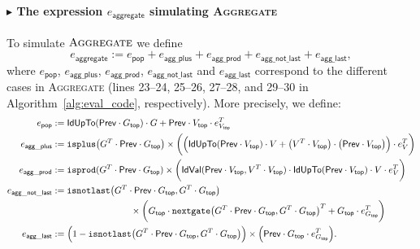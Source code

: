 \paragraph{$\blacktriangleright$ The expression $e_{\mathsf{aggregate}}$ simulating {\normalfont\textsc{Aggregate}}}
To simulate $\textsc{Aggregate}$ we define
$$
	e_{\mathsf{aggregate}}:=e_{\mathsf{pop}}+e_{\mathsf{agg\_plus}}+e_{\mathsf{agg\_prod}}+e_{\mathsf{agg\_not\_last}}+e_{\mathsf{agg\_last}},
	$$
where  $e_{\mathsf{pop}}$, $e_{\mathsf{agg\_plus}}$, $e_{\mathsf{agg\_prod}}$, $e_{\mathsf{agg\_not\_last}}$ and $e_{\mathsf{agg\_last}}$ correspond to the different cases in \textsc{Aggregate} (lines 23--24, 25--26, 27--28, and 29--30 in Algorithm~\ref{alg:eval_code}, respectively). More precisely, we define:
%
    \begin{align*}\allowdisplaybreaks
        e_{\mathsf{pop}} &:= \Iden{\mathsf{Prev}\cdot G_{\mathsf{top}}}\cdot G + \mathsf{Prev}\cdot V_{\mathsf{top}}\cdot e_{V_{\mathsf{top}}}^T  \\
        e_{\mathsf{agg\_plus}}&:= \texttt{isplus}\bigl(G^T \cdot \mathsf{Prev} \cdot G_{\mathsf{top}}\bigr) \times \biggl(\Bigl(\Iden{\mathsf{Prev}\cdot V_{\mathsf{top}}} \cdot V + \bigl( V^T \cdot V_{\mathsf{top}} \bigr)\cdot \bigl(\mathsf{Prev}\cdot V_{\mathsf{top}}\bigr)\Bigr) \cdot e_{V}^T \biggr) \\
        e_{\mathsf{agg\_prod}}&:= \isprod{G^T \cdot \mathsf{Prev} \cdot G_{\mathsf{top}}} \times \biggl(
				 \pondIden{\mathsf{Prev}\cdot V_{\mathsf{top}}}{V^T \cdot V_{\mathsf{top}}}\cdot 
				 \Iden{\mathsf{Prev}\cdot V_{\mathsf{top}}} \cdot V \cdot e_{V}^T \biggr) \\
e_{\mathsf{agg\_not\_last}} &:= \texttt{isnotlast}\bigl(G^T \cdot \mathsf{Prev} \cdot G_{\mathsf{top}},G^T \cdot G_{\mathsf{top}}\bigr) \\
&\hspace{3cm}\times \biggl(G_{\mathsf{top}} \cdot \texttt{nextgate}\bigl(G^T \cdot \mathsf{Prev}\cdot G_{\mathsf{top}},G^T \cdot G_{\mathsf{top}}\bigr)^T + G_{\mathsf{top}}\cdot e_{G_{\mathsf{top}}}^T \biggr) \\
 e_{\mathsf{agg\_last}}&:= \Bigl( 1 - \texttt{isnotlast}\bigl(G^T \cdot \mathsf{Prev}\cdot G_{\mathsf{top}},G^T \cdot G_{\mathsf{top}}\bigr)\Bigr)\times \Bigl(\mathsf{Prev}\cdot G_{\mathsf{top}} \cdot e_{G_{\mathsf{top}}}^T \Bigr).
    \end{align*}
